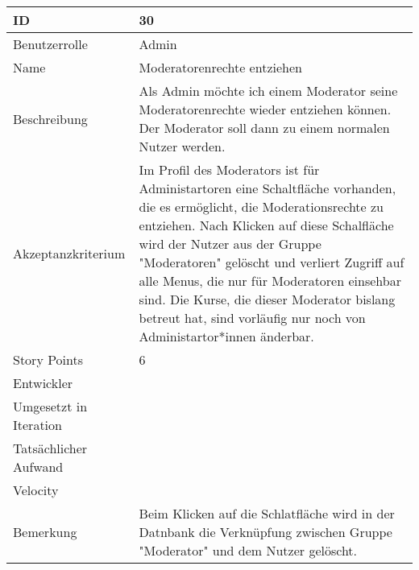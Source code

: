 \begin{tabularx}{\textwidth}{|p{}|X|}
	\hline
	ID & 30 \\
	\hline
	Benutzerrolle & Admin \\
	\hline
	Name & Moderatorenrechte entziehen\\
	\hline
	Beschreibung & Als Admin möchte ich einem Moderator seine Moderatorenrechte wieder entziehen können. Der Moderator soll dann zu einem normalen Nutzer werden. \\
	\hline
	Akzeptanzkriterium & Im Profil des Moderators ist für Administartoren eine Schaltfläche vorhanden, die es ermöglicht, die Moderationsrechte zu entziehen. Nach Klicken auf diese Schalfläche wird der Nutzer aus der Gruppe "Moderatoren" gelöscht und verliert Zugriff auf alle Menus, die nur für Moderatoren einsehbar sind. Die Kurse, die dieser Moderator bislang betreut hat, sind vorläufig nur noch von Administartor*innen änderbar. \\
	\hline
	Story Points & 6 \\
	\hline
	Entwickler &  \\
	\hline
	Umgesetzt in Iteration & \\
	\hline
	Tatsächlicher Aufwand & \\
	\hline
	Velocity & \\
	\hline
	Bemerkung & Beim Klicken auf die Schlatfläche wird in der Datnbank die Verknüpfung zwischen Gruppe "Moderator" und dem Nutzer gelöscht.\\
	\hline
\end{tabularx}
\vspace{20pt}
